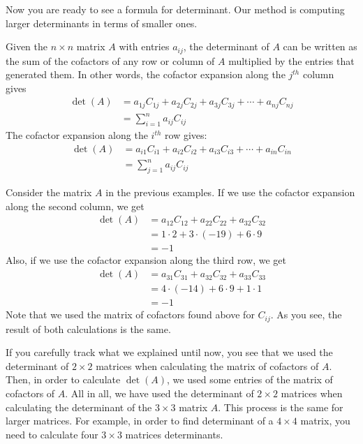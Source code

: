 Now you are ready to see a formula for determinant. Our method is computing larger determinants in terms of smaller ones.

	\begin{definition}
		Given the $n\times n$ matrix $A$ with entries $a_{ij}$, the determinant of $A$ can be written as the sum of the cofactors of any row or column of $A$ multiplied by the entries that generated them. In other words, the cofactor expansion along the $j^{th}$ column gives
		\begin{align*}
			\det(A)
				& = a_{1j}C_{1j} + a_{2j}C_{2j} + a_{3j}C_{3j} + \cdots + a_{nj}C_{nj}\\
				& = \sum_{i=1}^{n} a_{ij} C_{ij}
		\end{align*}
		The cofactor expansion along the $i^{th}$ row gives:
		\begin{align*}
			\det(A)
				& = a_{i1}C_{i1} + a_{i2}C_{i2} + a_{i3}C_{i3} + \cdots + a_{in}C_{in}\\
				& = \sum_{j=1}^{n} a_{ij} C_{ij}
		\end{align*}
	\end{definition}

	\begin{example}
		Consider the matrix $A$ in the previous examples. If we use the cofactor expansion along the second column, we get
		\begin{align*}
			\det(A)
				& =a_{12} C_{12} + a_{22}C_{22} + a_{32} C_{32}\\
				& = 1 \cdot 2 + 3 \cdot (-19) + 6 \cdot 9\\
				& = -1
		\end{align*}
		Also, if we use the cofactor expansion along the third row, we get
		\begin{align*}
			\det(A)
				& =a_{31} C_{31} + a_{32}C_{32} + a_{33} C_{33}\\
				& = 4 \cdot (-14) + 6 \cdot 9 + 1 \cdot 1\\
				& = -1
		\end{align*}
		Note that we used the matrix of cofactors found above for $C_{ij}$. As you see, the result of both calculations is the same.
	\end{example}

If you carefully track what we explained until now, you see that we used the determinant of $2\times 2$ matrices when calculating the matrix of cofactors of $A$. Then, in order to calculate $\det(A)$, we used some entries of the matrix of cofactors of $A$. All in all, we have used the determinant of $2\times 2$ matrices when calculating the determinant of the $3 \times 3$ matrix $A$. This process is the same for larger matrices. For example, in order to find determinant of a $4 \times 4$ matrix, you need to calculate four $3\times 3$ matrices determinants.

